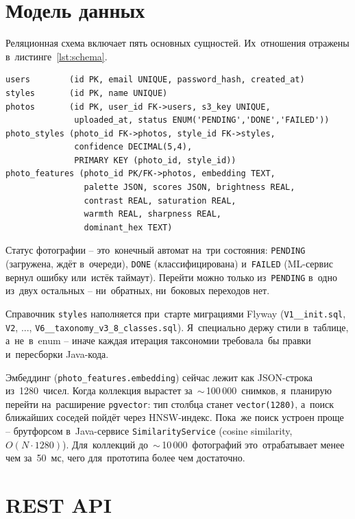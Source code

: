 \documentclass[a4paper,12pt]{diplom}
\begin{document}
\section{Модель данных}
\label{sec:datamodel}

Реляционная схема включает пять основных сущностей. Их~отношения отражены в~листинге~\ref{lst:schema}.

\begin{lstlisting}[caption={Схема реляционной модели данных},label=lst:schema,basicstyle=\ttfamily\small,frame=single]
users        (id PK, email UNIQUE, password_hash, created_at)
styles       (id PK, name UNIQUE)
photos       (id PK, user_id FK->users, s3_key UNIQUE,
              uploaded_at, status ENUM('PENDING','DONE','FAILED'))
photo_styles (photo_id FK->photos, style_id FK->styles,
              confidence DECIMAL(5,4),
              PRIMARY KEY (photo_id, style_id))
photo_features (photo_id PK/FK->photos, embedding TEXT,
                palette JSON, scores JSON, brightness REAL,
                contrast REAL, saturation REAL,
                warmth REAL, sharpness REAL,
                dominant_hex TEXT)
\end{lstlisting}

Статус фотографии -- это~конечный автомат на~три состояния: \texttt{PENDING} (загружена, ждёт в~очереди), \texttt{DONE} (классифицирована) и~\texttt{FAILED} (ML-сервис вернул ошибку или~истёк таймаут). Перейти можно только из~\texttt{PENDING} в~одно из~двух остальных -- ни~обратных, ни~боковых переходов нет.

Справочник \texttt{styles} наполняется при~старте миграциями Flyway (\texttt{V1\_\_init.sql}, \texttt{V2}, ..., \texttt{V6\_\_taxonomy\_v3\_8\_classes.sql}). Я~специально держу стили в~таблице, а~не~в~enum -- иначе каждая итерация таксономии требовала~бы правки и~пересборки Java-кода.

Эмбеддинг (\verb|photo_features.embedding|) сейчас лежит как JSON-строка из~1280~чисел. Когда коллекция вырастет за~$\sim$\,100\,000~снимков, я~планирую перейти на~расширение \texttt{pgvector}: тип столбца станет \texttt{vector(1280)}, а~поиск ближайших соседей пойдёт через HNSW-индекс. Пока~же поиск устроен проще -- брутфорсом в~Java-сервисе \texttt{SimilarityService} (cosine similarity, $O(N \cdot 1280)$). Для~коллекций до~$\sim$\,10\,000~фотографий это~отрабатывает менее чем за~50~мс, чего для~прототипа более чем достаточно.

\section{REST API}
\label{sec:api}
\end{document}
